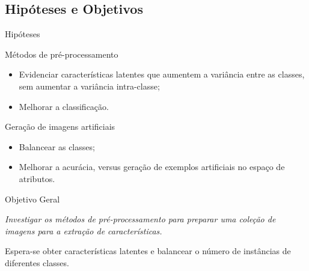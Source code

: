 \documentclass{beamer}
\begin{document}
\subsection{Hipóteses e Objetivos}
\setlength\leftmargini{1em}
\justifying
 \begin{frame}{Hipóteses}
  \begin{block}{Métodos de pré-processamento}
    \justifying
    \begin{itemize}
      \item Evidenciar características latentes que aumentem a variância entre as classes, sem aumentar a variância intra-classe;
      \item Melhorar a classificação.
    \end{itemize}
  \end{block}
  \begin{block}{Geração de imagens artificiais}
    \justifying
    \begin{itemize}
      \item Balancear as classes;
      \item Melhorar a acurácia, versus geração de exemplos artificiais no espaço de atributos.
    \end{itemize}
  \end{block}
\end{frame}
\begin{frame}{Objetivo Geral}
\setlength\leftmargini{1em}
\justifying
  \begin{block}{}
  \justifying
  \emph{Investigar os métodos de pré-processamento para preparar uma coleção de imagens para a extração de características.}

  \vspace{5mm}
  Espera-se obter características latentes e balancear o número de instâncias de diferentes classes.
  \end{block}
\end{frame}
\end{document}
